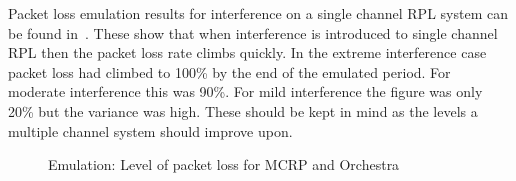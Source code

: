 
Packet loss emulation results for interference on a single channel RPL system can be found in~\cite{mcrp}. These show that when interference is introduced to single channel RPL then the packet loss rate climbs quickly.  In the extreme interference case packet loss had climbed to 100\% by the end of the emulated period. For moderate interference this was 90\%.  For mild interference the figure was only 20\% but the variance was high.  These should be kept in mind as the levels a multiple channel system should improve upon.

\begin{figure}
\centering
{}
\caption{Emulation: Level of packet loss for MCRP and Orchestra}
\label{fig:layouts}
\end{figure}


